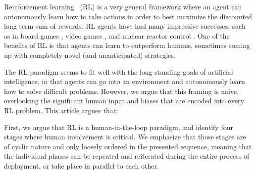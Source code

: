 \documentclass[twoside,11pt]{article}
\begin{document}
%

Reinforcement learning~\cite{SuttonBarto:2018:RLIntroduction} (RL) is a very general framework where an agent can autonomously learn how to take actions in order to best maximize the discounted long term sum of rewards. RL agents have had many impressive successes, such as in board games \cite{}, video games \cite{}, and nuclear reactor control \cite{}. One of the benefits of RL is that agents can learn to outperform humans, sometimes coming up with completely novel (and unanticipated) strategies.

The RL paradigm seems to fit well with the long-standing goals of artificial intelligence, in that agents can go into an environment and autonomously learn how to solve difficult problems. However, we argue that this framing is naive, overlooking the significant human input and biases that are encoded into every RL problem. This article argues that: 
\begin{center}
\end{center}

First, we argue that RL is a human-in-the-loop paradigm, and identify four stages where human involvement is critical. We emphasize that those stages are of cyclic nature and only loosely ordered in the presented sequence, meaning that the individual phases can be repeated and reiterated during the entire process of deployment, or take place in parallel to each other.
\end{document}
